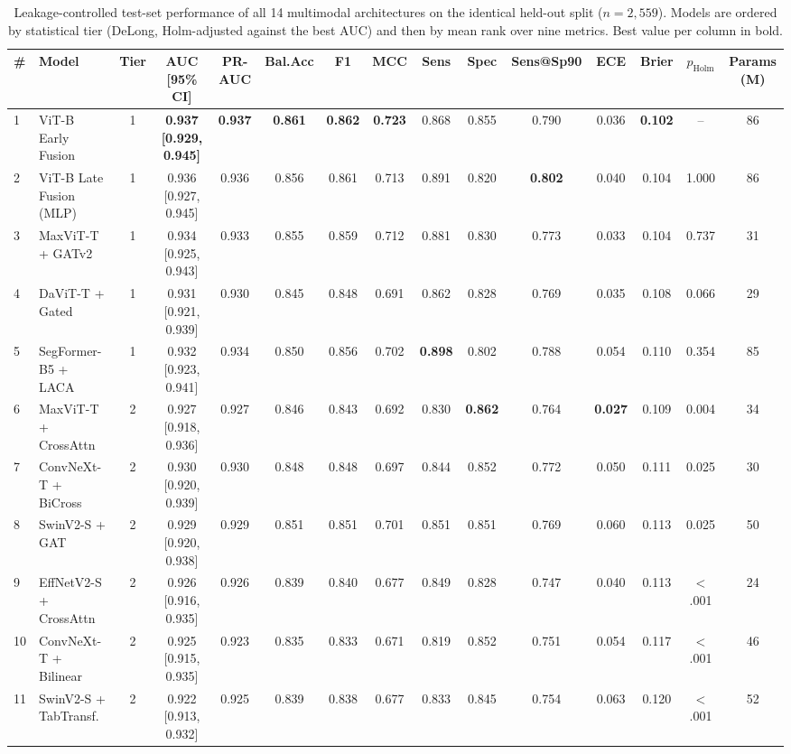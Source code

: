 \begin{table}[!t]
\centering
\caption{Leakage-controlled test-set performance of all 14 multimodal architectures on the identical held-out split ($n=2{,}559$). Models are ordered by statistical tier (DeLong, Holm-adjusted against the best AUC) and then by mean rank over nine metrics. Best value per column in bold.}
\label{tab:ranking}
\scriptsize
\begin{tabular}{llccccccccccccc}
\toprule
\# & Model & Tier & AUC [95\% CI] & PR-AUC & Bal.Acc & F1 & MCC & Sens & Spec & Sens@Sp90 & ECE & Brier & $p_{\mathrm{Holm}}$ & Params (M) \\
\midrule
1 & ViT-B Early Fusion & 1 & \textbf{0.937 [0.929, 0.945]} & \textbf{0.937} & \textbf{0.861} & \textbf{0.862} & \textbf{0.723} & 0.868 & 0.855 & 0.790 & 0.036 & \textbf{0.102} & -- & 86 \\
2 & ViT-B Late Fusion (MLP) & 1 & 0.936 [0.927, 0.945] & 0.936 & 0.856 & 0.861 & 0.713 & 0.891 & 0.820 & \textbf{0.802} & 0.040 & 0.104 & 1.000 & 86 \\
3 & MaxViT-T + GATv2 & 1 & 0.934 [0.925, 0.943] & 0.933 & 0.855 & 0.859 & 0.712 & 0.881 & 0.830 & 0.773 & 0.033 & 0.104 & 0.737 & 31 \\
4 & DaViT-T + Gated & 1 & 0.931 [0.921, 0.939] & 0.930 & 0.845 & 0.848 & 0.691 & 0.862 & 0.828 & 0.769 & 0.035 & 0.108 & 0.066 & 29 \\
5 & SegFormer-B5 + LACA & 1 & 0.932 [0.923, 0.941] & 0.934 & 0.850 & 0.856 & 0.702 & \textbf{0.898} & 0.802 & 0.788 & 0.054 & 0.110 & 0.354 & 85 \\
6 & MaxViT-T + CrossAttn & 2 & 0.927 [0.918, 0.936] & 0.927 & 0.846 & 0.843 & 0.692 & 0.830 & \textbf{0.862} & 0.764 & \textbf{0.027} & 0.109 & 0.004 & 34 \\
7 & ConvNeXt-T + BiCross & 2 & 0.930 [0.920, 0.939] & 0.930 & 0.848 & 0.848 & 0.697 & 0.844 & 0.852 & 0.772 & 0.050 & 0.111 & 0.025 & 30 \\
8 & SwinV2-S + GAT & 2 & 0.929 [0.920, 0.938] & 0.929 & 0.851 & 0.851 & 0.701 & 0.851 & 0.851 & 0.769 & 0.060 & 0.113 & 0.025 & 50 \\
9 & EffNetV2-S + CrossAttn & 2 & 0.926 [0.916, 0.935] & 0.926 & 0.839 & 0.840 & 0.677 & 0.849 & 0.828 & 0.747 & 0.040 & 0.113 & $<$.001 & 24 \\
10 & ConvNeXt-T + Bilinear & 2 & 0.925 [0.915, 0.935] & 0.923 & 0.835 & 0.833 & 0.671 & 0.819 & 0.852 & 0.751 & 0.054 & 0.117 & $<$.001 & 46 \\
11 & SwinV2-S + TabTransf. & 2 & 0.922 [0.913, 0.932] & 0.925 & 0.839 & 0.838 & 0.677 & 0.833 & 0.845 & 0.754 & 0.063 & 0.120 & $<$.001 & 52 \\

\end{tabular}
\end{table}
